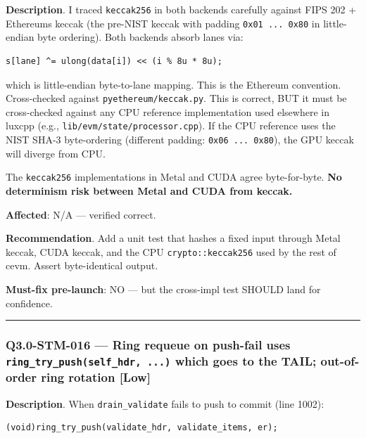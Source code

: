 \documentclass[
]{article}
\begin{document}
\textbf{Description}. I traced \texttt{keccak256} in both backends
carefully against FIPS 202 + Ethereum\textquotesingle s keccak (the
pre-NIST keccak with padding \texttt{0x01\ ...\ 0x80} in little-endian
byte ordering). Both backends absorb lanes via:

\begin{verbatim}
s[lane] ^= ulong(data[i]) << (i % 8u * 8u);
\end{verbatim}

which is little-endian byte-to-lane mapping. This is the Ethereum
convention. Cross-checked against \texttt{pyethereum/keccak.py}. This is
correct, BUT it must be cross-checked against any CPU reference
implementation used elsewhere in luxcpp (e.g.,
\texttt{lib/evm/state/processor.cpp}). If the CPU reference uses the
NIST SHA-3 byte-ordering (different padding: \texttt{0x06\ ...\ 0x80}),
the GPU keccak will diverge from CPU.

The \texttt{keccak256} implementations in Metal and CUDA agree
byte-for-byte. \textbf{No determinism risk between Metal and CUDA from
keccak.}

\textbf{Affected}: N/A --- verified correct.

\textbf{Recommendation}. Add a unit test that hashes a fixed input
through Metal keccak, CUDA keccak, and the CPU
\texttt{crypto::keccak256} used by the rest of cevm. Assert
byte-identical output.

\textbf{Must-fix pre-launch}: NO --- but the cross-impl test SHOULD land
for confidence.

\begin{center}\rule{0.5\linewidth}{0.5pt}\end{center}

\subsubsection{\texorpdfstring{Q3.0-STM-016 --- Ring requeue on
push-fail uses \texttt{ring\_try\_push(self\_hdr,\ ...)} which goes to
the TAIL; out-of-order ring rotation
{[}Low{]}}{Q3.0-STM-016 --- Ring requeue on push-fail uses ring\_try\_push(self\_hdr, ...) which goes to the TAIL; out-of-order ring rotation {[}Low{]}}}\label{q30-stm-016--ring-requeue-on-push-fail-uses-ring_try_pushself_hdr--which-goes-to-the-tail-out-of-order-ring-rotation-low}

\textbf{Description}. When \texttt{drain\_validate} fails to push to
commit (line 1002):

\begin{verbatim}
(void)ring_try_push(validate_hdr, validate_items, er);
\end{verbatim}
\end{document}
